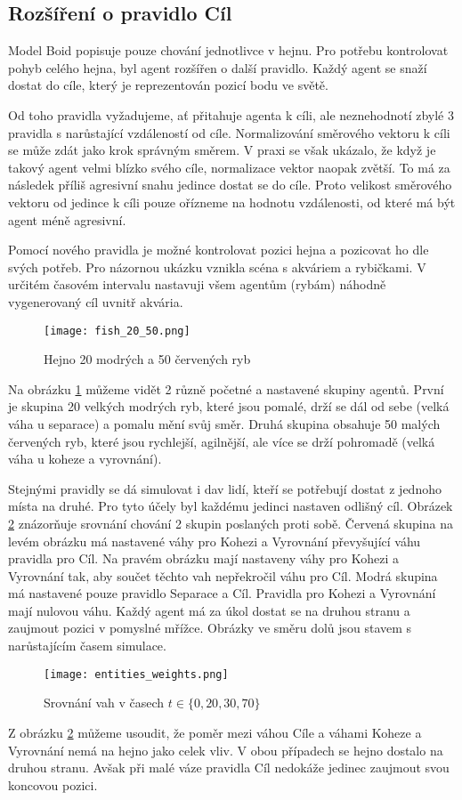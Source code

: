 \subsection{Rozšíření o pravidlo Cíl}
Model Boid popisuje pouze chování jednotlivce v hejnu. Pro potřebu kontrolovat pohyb celého hejna, byl agent rozšířen o další pravidlo. Každý agent se snaží dostat do cíle, který je reprezentován pozicí bodu ve světě. 
\par
Od toho pravidla vyžadujeme, ať přitahuje agenta k cíli, ale neznehodnotí zbylé 3 pravidla s narůstající vzdáleností od cíle. Normalizování směrového vektoru k cíli se může zdát jako krok správným směrem. V praxi se však ukázalo, že když je takový agent velmi blízko svého cíle, normalizace vektor naopak zvětší. To má za následek příliš agresivní snahu jedince dostat se do cíle. Proto velikost směrového vektoru od jedince k cíli pouze ořízneme na hodnotu vzdálenosti, od které má být agent méně agresivní. 
\par
Pomocí nového pravidla je možné kontrolovat pozici hejna a pozicovat ho dle svých potřeb. Pro názornou ukázku vznikla scéna s akváriem a rybičkami. V určitém časovém intervalu nastavuji všem agentům (rybám) náhodně vygenerovaný cíl uvnitř akvária.  
\begin{figure}[H]
	\label{fig:ryby_20_50}
	\texttt{[image: fish\_20\_50.png]}
	\centering
	\caption{Hejno 20 modrých a 50 červených ryb}
\end{figure}
Na obrázku \ref{fig:ryby_20_50} můžeme vidět 2 různě početné a nastavené skupiny agentů. První je skupina 20 velkých modrých ryb, které jsou pomalé, drží se dál od sebe (velká váha u separace) a pomalu mění svůj směr. Druhá skupina obsahuje 50 malých červených ryb, které jsou rychlejší, agilnější, ale více se drží pohromadě (velká váha u koheze a vyrovnání). 
\par
Stejnými pravidly se dá simulovat i dav lidí, kteří se potřebují dostat z jednoho místa na druhé. Pro tyto účely byl každému jedinci nastaven odlišný cíl. Obrázek \ref{fig:srovnaniVahy} znázorňuje srovnání chování 2 skupin poslaných proti sobě. Červená skupina na levém obrázku má nastavené váhy pro Kohezi a Vyrovnání převyšující váhu pravidla pro Cíl. Na pravém obrázku mají nastaveny váhy pro Kohezi a Vyrovnání tak, aby součet těchto vah nepřekročil váhu pro Cíl. Modrá skupina má nastavené pouze pravidlo Separace a Cíl. Pravidla pro Kohezi a Vyrovnání mají nulovou váhu. Každý agent má za úkol dostat se na druhou stranu a zaujmout pozici v pomyslné mřížce. Obrázky ve směru dolů jsou stavem s narůstajícím časem simulace. 
\begin{figure}[H]
	\texttt{[image: entities\_weights.png]}
	\centering
	\caption{Srovnání vah v časech $t\in\{ 0,20,30,70\} $}
	\label{fig:srovnaniVahy}
\end{figure}
Z obrázku \ref{fig:srovnaniVahy} můžeme usoudit, že poměr mezi váhou Cíle a váhami Koheze a Vyrovnání nemá na hejno jako celek vliv. V obou případech se hejno dostalo na druhou stranu. Avšak při malé váze pravidla Cíl nedokáže jedinec zaujmout svou koncovou pozici.  

